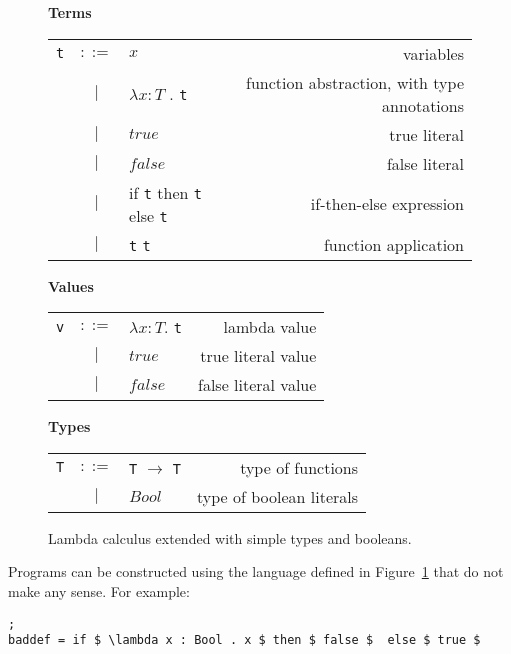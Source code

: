 \begin{figure}[H]\label{fig:simpleCalc}
    \centering
    \vspace{1cm}
    \textbf{Terms} \\
    \begin{tabular}{l c p{3cm} r}
        \texttt{t} & $ ::= $ & $ x $ &                   variables \\
      & $ | $ & $ \lambda x : T $ . \texttt{t} &          function abstraction, with type annotations \\
      & $ | $ & $ true $ &          true literal \\
      & $ | $ & $ false $ &          false literal \\
      & $ | $ & if \texttt{t} then \texttt{t} else \texttt{t}  &          if-then-else expression \\
      & $ | $ & \texttt{t} \texttt{t} &          function application \\
    \end{tabular}

    \vspace{1cm}
    \textbf{Values} \\
    \begin{tabular}{l c p{3cm} r}
        \texttt{v} & $ ::= $ & $ \lambda x : T . $ \texttt{t} &                   lambda value \\
      & $ | $ & $ true $ &          true literal value \\
      & $ | $ & $ false $ &          false literal value \\
    \end{tabular}

    \vspace{1cm}
    \textbf{Types} \\
    \begin{tabular}{l c p{3cm} r}
        \texttt{T} & $ ::= $ & \texttt{T} $ \rightarrow $ \texttt{T} &      type of functions \\
      & $ | $ & $ Bool $ &          type of boolean literals \\
    \end{tabular}

    \caption{Lambda calculus extended with simple types and booleans.}
\end{figure}
Programs can be constructed using the language defined in Figure~\ref{fig:simpleCalc}
that do not make any sense. For example:

\begin{lstlisting}[mathescape, nolol, label={lst:simple}];
baddef = if $ \lambda x : Bool . x $ then $ false $  else $ true $
\end{lstlisting}


